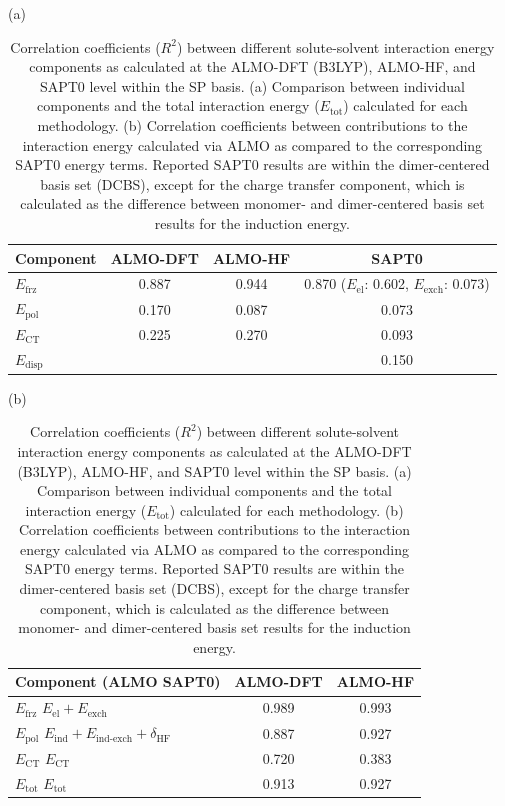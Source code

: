 \begin{table}
  \centering
  \caption[Correlation between ALMO and SAPT terms]{Correlation coefficients (\(R^2\)) between different solute-solvent interaction energy components as calculated at the ALMO-DFT (B3LYP), ALMO-HF, and SAPT0 level within the SP basis. (a) Comparison between individual components and the total interaction energy (\(E_{\text{tot}}\)) calculated for each methodology. (b) Correlation coefficients between contributions to the \cotil interaction energy calculated via ALMO as compared to the corresponding SAPT0 energy terms. Reported SAPT0 results are within the dimer-centered basis set (DCBS), except for the charge transfer component, which is calculated as the difference between monomer- and dimer-centered basis set results for the induction energy.}
  \label{paper_02:tab:7}

  (a)

  \begin{tabular}{lccc}
    \toprule
    Component & ALMO-DFT & ALMO-HF & SAPT0 \\
    \midrule
    \(E_{\text{frz}}\) & 0.887 & 0.944 & 0.870 (\(E_{\text{el}}\): 0.602, \(E_{\text{exch}}\): 0.073) \\
    \(E_{\text{pol}}\) & 0.170 & 0.087 & 0.073 \\
    \(E_{\text{CT}}\) & 0.225 & 0.270 & 0.093 \\
    \(E_{\text{disp}}\) & \textemdash{} & \textemdash{} & 0.150 \\
    \bottomrule
  \end{tabular}

  (b)

  \begin{tabular}{lcc}
    \toprule
    Component (ALMO \textemdash{} SAPT0) & ALMO-DFT & ALMO-HF \\
    \midrule
    \(E_{\text{frz}}\) \textemdash{} \(E_{\text{el}} + E_{\text{exch}}\) & 0.989 & 0.993 \\
    \(E_{\text{pol}}\) \textemdash{} \(E_{\text{ind}} + E_{\text{ind-exch}} + \delta_{\text{HF}}\) & 0.887 & 0.927 \\
    \(E_{\text{CT}}\) \textemdash{} \(E_{\text{CT}}\) & 0.720 & 0.383 \\
    \(E_{\text{tot}}\) \textemdash{} \(E_{\text{tot}}\) & 0.913 & 0.927 \\
    \bottomrule
  \end{tabular}
\end{table}

